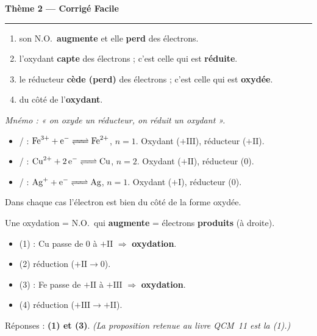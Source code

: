\documentclass[11pt,a4paper]{article}
\newcommand{\NO}{\ensuremath{\mathrm{N.O.}}}
\begin{document}
\begin{center}
{\LARGE\bfseries\color{primarydark}Thème 2 — Corrigé Facile}\\[-2pt]
{\color{corrcol}\rule{\textwidth}{1pt}}
\end{center}

\begin{corr}
\begin{enumerate}[label=(\alph*),leftmargin=2em,topsep=1pt,itemsep=1.5pt]
  \item son \NO\ \textbf{augmente} et elle \textbf{perd} des électrons.
  \item l'oxydant \textbf{capte} des électrons ; c'est celle qui est \textbf{réduite}.
  \item le réducteur \textbf{cède (perd)} des électrons ; c'est celle qui est \textbf{oxydée}.
  \item du côté de l'\textbf{oxydant}.
\end{enumerate}
\emph{Mnémo : « on oxyde un réducteur, on réduit un oxydant ».}
\end{corr}

\begin{corr}
\begin{itemize}[leftmargin=1.5em,topsep=1pt,itemsep=1.5pt]
  \item {}/ : $\ce{Fe^{3+} + e^- <=> Fe^{2+}}$, $n=1$.
        Oxydant  ($+\mathrm{III}$), réducteur  ($+\mathrm{II}$).
  \item {}/ : $\ce{Cu^{2+} + 2 e^- <=> Cu}$, $n=2$.
        Oxydant  ($+\mathrm{II}$), réducteur  ($0$).
  \item {}/ : $\ce{Ag+ + e^- <=> Ag}$, $n=1$.
        Oxydant  ($+\mathrm{I}$), réducteur  ($0$).
\end{itemize}
Dans chaque cas l'électron est bien du côté de la forme oxydée.
\end{corr}

\begin{corr}
Une oxydation = \NO\ qui \textbf{augmente} = électrons \textbf{produits} (à droite).
\begin{itemize}[leftmargin=1.5em,topsep=1pt,itemsep=1pt]
  \item (1)  : Cu passe de $0$ à $+\mathrm{II}$ $\Rightarrow$ \textbf{oxydation}. \checkmark
  \item (2) réduction ($+\mathrm{II}\to 0$).
  \item (3)  : Fe passe de $+\mathrm{II}$ à $+\mathrm{III}$ $\Rightarrow$ \textbf{oxydation}. \checkmark
  \item (4) réduction ($+\mathrm{III}\to +\mathrm{II}$).
\end{itemize}
Réponses : \textbf{(1) et (3)}. \emph{(La proposition retenue au livre QCM~11 est la (1).)}
\end{corr}
\end{document}

